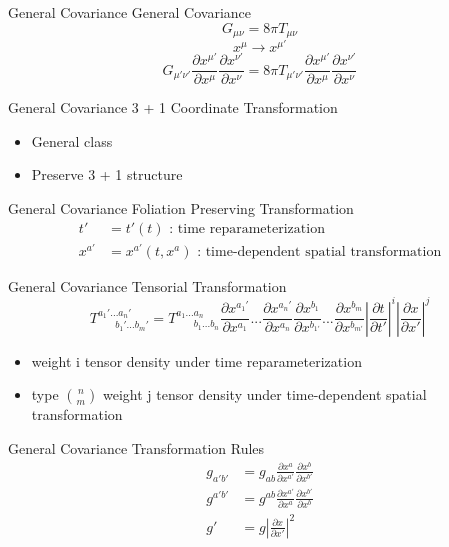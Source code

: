 \documentclass[xcolor=dvipsnames]{beamer}
\begin{document}
	\begin{frame}{General Covariance}
		General Covariance
		\pause
		\Large
		\[
		G_{\mu\nu} = 8\pi T_{\mu\nu}
		\]
		\pause
		\[
		x^{\mu} \rightarrow x^{\mu'}
		\]
		\pause
		\[
		G_{\mu'\nu'}\frac{\partial x^{\mu'}}{\partial x^{\mu}}\frac{\partial x^{\nu'}}{\partial x^{\nu}} = 8 \pi T_{\mu'\nu'}\frac{\partial x^{\mu'}}{\partial x^{\mu}}\frac{\partial x^{\nu'}}{\partial x^{\nu}}
		\]
	\end{frame}
	\begin{frame}{General Covariance}
		3 + 1 Coordinate Transformation
		\begin{itemize}
			\item{General class}
			\item{Preserve 3 + 1 structure}
		\end{itemize}
	\end{frame}
	\begin{frame}{General Covariance}
		Foliation Preserving Transformation
		\pause
		\begin{align*}
		t' &= t'(t)\text{  : time reparameterization}\\
		x^{a'} &= x^{a'}(t, x^{a})\text{  : time-dependent spatial transformation}
	\end{align*}
	\end{frame}
	\begin{frame}{General Covariance}
		Tensorial Transformation
		\[
		T^{a_{1}'...a_{n}'}_{~~~~~~~~b_{1}'...b_{m}'} = T^{a_{1}...a_{n}}_{~~~~~~~~b_{1}...b_{n}}\frac{\partial x^{a_{1}'}}{\partial x^{a_{1}}}...\frac{\partial x^{a_{n}'}}{\partial x^{a_{n}}}\frac{\partial x^{b_{1}}}{\partial x^{b_{1'}}}...\frac{\partial x^{b_{m}}}{\partial x^{b_{m'}}}\left|\frac{\partial t}{\partial t'}\right|^{i}\left|\frac{\partial x}{\partial x'}\right|^{j} 
		\]
		\pause
		\begin{itemize}
			\item{weight i tensor density under time reparameterization}
			\item{type $n\choose m$ weight j tensor density under time-dependent spatial transformation}
		\end{itemize}
	\end{frame}
	\begin{frame}{General Covariance}
		Transformation Rules
		\begin{align*}
		g_{a'b'} & = g_{ab}\frac{\partial x^{a}}{\partial x^{a'}}\frac{\partial x^{b}}{\partial x^{b'}}\\
		g^{a'b'} & = g^{ab}\frac{\partial x^{a'}}{\partial x^{a}}\frac{\partial x^{b'}}{\partial x^{b}}\\
		g' & = g\left|\frac{\partial x}{\partial x'}\right|^{2}
	\end{align*}
	\end{frame}
\end{document}
